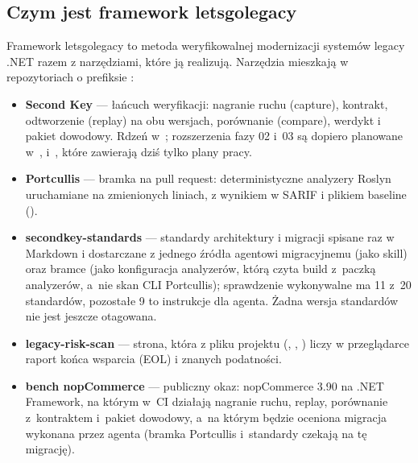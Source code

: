 
\subsection{Czym jest framework letsgolegacy}\label{sec:wprowadzenie-framework}

Framework letsgolegacy to metoda weryfikowalnej modernizacji systemów legacy .NET razem z
narzędziami, które ją realizują. Narzędzia mieszkają w repozytoriach o prefiksie
:

\begin{itemize}
  \item \textbf{Second Key} --- łańcuch weryfikacji: nagranie ruchu (capture), kontrakt,
        odtworzenie (replay) na obu wersjach, porównanie (compare), werdykt i pakiet
        dowodowy. Rdzeń w~; rozszerzenia fazy 02 i~03 są
        dopiero planowane w~, 
        i~, które zawierają dziś tylko plany pracy.
  \item \textbf{Portcullis} --- bramka na pull request: deterministyczne analyzery Roslyn
        uruchamiane na zmienionych liniach, z wynikiem w SARIF i plikiem baseline
        ().
  \item \textbf{secondkey-standards} --- standardy architektury i migracji spisane raz w
        Markdown i dostarczane z jednego źródła agentowi migracyjnemu (jako skill) oraz
        bramce (jako konfiguracja analyzerów, którą czyta build z~paczką analyzerów, a~nie
        skan CLI Portcullis); sprawdzenie wykonywalne ma 11 z~20 standardów, pozostałe 9 to
        instrukcje dla agenta. Żadna wersja standardów nie jest jeszcze otagowana.
  \item \textbf{legacy-risk-scan} --- strona, która z pliku projektu (,
        , ) liczy w przeglądarce raport
        końca wsparcia (EOL) i znanych podatności.
  \item \textbf{bench nopCommerce} --- publiczny okaz: nopCommerce 3.90 na .NET Framework,
        na którym w~CI działają nagranie ruchu, replay, porównanie z~kontraktem i~pakiet
        dowodowy, a~na którym będzie oceniona migracja wykonana przez agenta (bramka
        Portcullis i~standardy czekają na tę migrację).
\end{itemize}

